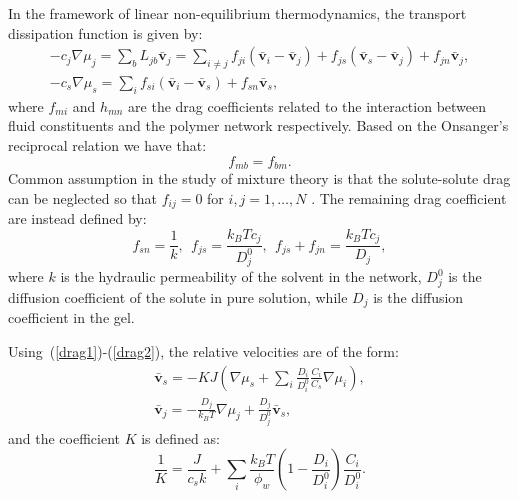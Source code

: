 \documentclass[runningheads]{llncs}
\begin{document}
In the framework of linear non-equilibrium thermodynamics, the transport dissipation function is given by:
\begin{eqnarray}
-c_j \nabla \mu_j = \sum_b L_{jb} \bar{\mathbf{v}}_j= \sum_{i\neq j} f_{ji} \left(\bar{\mathbf{v}}_i-\bar{\mathbf{v}}_j\right) + f_{js} (\bar{\mathbf{v}}_s-\bar{\mathbf{v}}_j) + f_{jn} \bar{\mathbf{v}}_j,\label{drag1}\\
-c_s \nabla \mu_s = \sum_i f_{si} \left(\bar{\mathbf{v}}_i-\bar{\mathbf{v}}_s\right)+ f_{sn} \bar{\mathbf{v}}_s,
\end{eqnarray}
where $f_{mi}$ and $h_{mn}$ are the drag coefficients related to the interaction between fluid constituents and the polymer network respectively. Based on the Onsanger's reciprocal relation we have that:
\begin{equation}
f_{mb}=f_{bm}.
\end{equation}
Common assumption in the study of mixture theory is that the solute-solute drag can be neglected so that $f_{ij}=0$ for $i,j=1,\ldots,N$ \cite{ecm1,biophysics}. The remaining drag coefficient are instead defined by:
\begin{equation}
f_{sn} = \frac{1}{k}, \ \ f_{js}=\frac{k_BT c_j}{D^0_{j}},\ \  f_{js}+f_{jn}= \frac{k_BT c_j}{D_j}, \label{drag2}
\end{equation}
where $k$ is the hydraulic permeability of the solvent in the network, $D^0_j$ is the diffusion coefficient of the solute in pure solution, while $D_j$ is the diffusion coefficient in the gel.

Using~(\ref{drag1})-(\ref{drag2}), the relative velocities are of the form:
\begin{eqnarray}
\bar{\mathbf{v}}_s = -K J \left(\nabla \mu_s +\sum_i \frac{D_i}{D^0_i} \frac{C_i}{C_s} \nabla \mu_i\right),\\
\bar{\mathbf{v}}_j = - \frac{D_j}{k_B T}\nabla \mu_j + \frac{D_j}{D^0_j} \bar{\mathbf{v}}_s, \label{vbar}
\end{eqnarray}
and the coefficient $K$ is defined as:
\begin{equation}
\frac{1}{K} = \frac{J}{c_sk} + \sum_i \frac{k_B T}{\phi_w} \left(1-\frac{D_i}{D^0_i}\right) \frac{C_i}{D^0_i}.
\end{equation}
\end{document}
